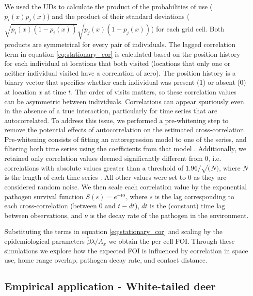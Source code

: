 ﻿\documentclass[11pt]{article}
\begin{document}
We used the UDs to calculate the product of the probabilities of use ($p_i(x)p_j(x)$) and the product of their standard deviations ($\sqrt{p_i(x)(1-p_i(x))}\sqrt{p_j(x)(1-p_j(x))}$) for each grid cell. Both products are symmetrical for every pair of individuals. 
The lagged correlation term in equation \ref{eq:stationary_cor} is calculated based on the position history for each individual at locations that both visited (locations that only one or neither individual visited have a correlation of zero). The position history is a binary vector that specifies whether each individual was present (1) or absent (0) at location $x$ at time $t$. 
The order of visits matters, so these correlation values can be asymmetric between individuals. 
Correlations can appear spuriously even in the absence of a true interaction, particularly for time series that are autocorrelated. To address this issue, we performed a pre-whitening step to remove the potential effects of autocorrelation on the estimated cross-correlation. Pre-whitening consists of fitting an autoregression model to one of the series, and filtering both time series using the coefficients from that model \citep{Dean2016}. Additionally, we retained only correlation values deemed significantly different from 0, i.e. correlations with absolute values greater than a threshold of $1.96/\sqrt(N)$, where $N$ is the length of each time series \citep{Dean2016}. All other values were set to 0 as they are considered random noise.
We then scale each correlation value by the exponential pathogen survival function $S(s) = e^{-\nu s}$, where $s$ is the lag corresponding to each cross-correlation (between 0 and $t-dt$), $dt$ is the (constant) time lag between observations, and $\nu$ is the decay rate of the pathogen in the environment. 

Substituting the terms in equation \ref{eq:stationary_cor} and scaling by the epidemiological parameters $\tilde\beta\lambda/ A_x$ we obtain the per-cell FOI. 
Through these simulations we explore how the expected FOI is influenced by correlation in space use, home range overlap, pathogen decay rate, and contact distance. 

\subsection*{Empirical application - White-tailed deer}
\end{document}
